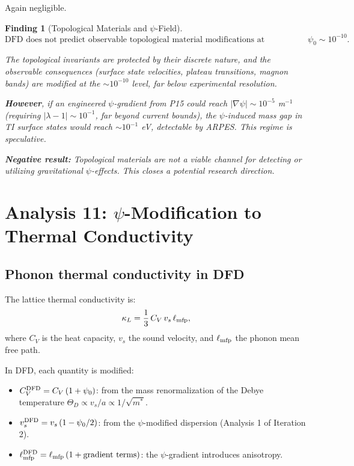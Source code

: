 \documentclass[11pt]{article}
\newtheorem{finding}{Finding}
\begin{document}
Again negligible.

\begin{finding}[Topological Materials and $\psi$-Field]
\begin{equation}\label{eq:topo}
\boxed{\text{DFD does not predict observable topological material modifications at gravitational } \psi_0 \sim 10^{-10}.}
\end{equation}

The topological invariants are protected by their discrete nature, and the observable consequences (surface state velocities, plateau transitions, magnon bands) are modified at the $\sim 10^{-10}$ level, far below experimental resolution.

\textbf{However}, if an engineered $\psi$-gradient from P15 could reach $|\nabla\psi| \sim 10^{-5}$ m$^{-1}$ (requiring $|\lambda - 1| \sim 10^{-1}$, far beyond current bounds), the $\psi$-induced mass gap in TI surface states would reach $\sim 10^{-1}$ eV, detectable by ARPES. This regime is speculative.

\textbf{Negative result:} Topological materials are not a viable channel for detecting or utilizing gravitational $\psi$-effects. This closes a potential research direction.
\end{finding}

\section{Analysis 11: $\psi$-Modification to Thermal Conductivity}
\label{sec:thermal}

\subsection{Phonon thermal conductivity in DFD}

The lattice thermal conductivity is:
\begin{equation}
\kappa_L = \frac{1}{3}\,C_V\,v_s\,\ell_{\rm mfp},
\end{equation}
where $C_V$ is the heat capacity, $v_s$ the sound velocity, and $\ell_{\rm mfp}$ the phonon mean free path.

In DFD, each quantity is modified:
\begin{itemize}
\item $C_V^{\rm DFD} = C_V\,(1 + \psi_0)$: from the mass renormalization of the Debye temperature $\Theta_D \propto v_s/a \propto 1/\sqrt{m^*}$.
\item $v_s^{\rm DFD} = v_s\,(1 - \psi_0/2)$: from the $\psi$-modified dispersion (Analysis 1 of Iteration 2).
\item $\ell_{\rm mfp}^{\rm DFD} = \ell_{\rm mfp}\,(1 + \text{gradient terms})$: the $\psi$-gradient introduces anisotropy.
\end{itemize}
\end{document}
